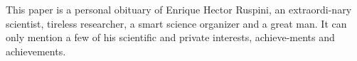 This paper is a personal obituary of Enrique Hector Ruspini, an extraordi-nary scientist, tireless researcher, a smart science organizer and a great man. It can only mention a few of his scientific and private interests, achieve-ments and achievements.
